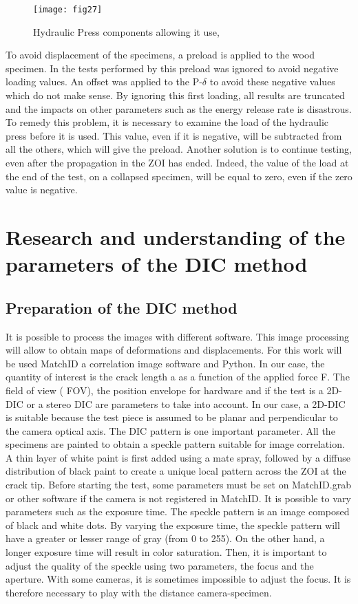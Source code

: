 \begin{figure}[htp]
	\centering
	\texttt{[image: fig27]}
	\caption{Hydraulic Press components allowing it use, \cite{MALFAIT2021}}
	\label{fig:fig27}
\end{figure}

To avoid displacement of the specimens, a preload is applied to the wood specimen. In the tests performed by \cite{MALFAIT2021} this preload was ignored to avoid negative loading values. An offset was applied to the P-$\delta$ to avoid these negative values which do not make sense. By ignoring this first loading, all results are truncated and the impacts on other parameters such as the energy release rate is disastrous. 
To remedy this problem, it is necessary to examine the load of the hydraulic press before it is used. This value, even if it is negative, will be subtracted from all the others, which will give the preload. Another solution is to continue testing, even after the propagation in the ZOI has ended. Indeed, the value of the load at the end of the test, on a collapsed specimen, will be equal to zero, even if the zero value is negative.

\section{Research and understanding of the parameters of the DIC method}

\subsection{Preparation of the DIC method}

It is possible to process the images with different software. This image processing will allow to obtain maps of deformations and displacements. For this work will be used MatchID a correlation image software and Python.
In our case, the quantity of interest is the crack length a as a function of the applied force F. The field of view ( FOV), the position envelope for hardware and if the test is a 2D-DIC or a stereo DIC are parameters to take into account. In our case, a 2D-DIC is suitable because the test piece is assumed to be planar and perpendicular to the camera optical axis. The DIC pattern is one important parameter. All the specimens are painted to obtain a speckle pattern suitable for image correlation. A thin layer of white paint is first added using a mate spray, followed by a diffuse distribution of black paint to create a unique local pattern across the ZOI at the crack tip. Before starting the test, some parameters must be set on MatchID.grab or other software if the camera is not registered in MatchID. It is possible to vary parameters such as the exposure time. The speckle pattern is an image composed of black and white dots. By varying the exposure time, the speckle pattern will have a greater or lesser range of gray (from 0 to 255). On the other hand, a longer exposure time will result in color saturation. Then, it is important to adjust the quality of the speckle using two parameters, the focus and the aperture. With some cameras, it is sometimes impossible to adjust the focus. It is therefore necessary to play with the distance camera-specimen.

